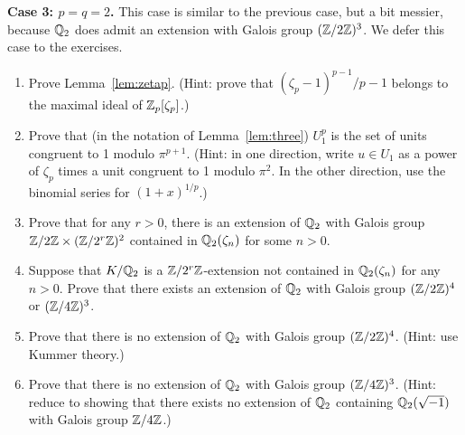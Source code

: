 \noindent
\textbf{Case 3: $p=q=2$.}
This case is similar to the previous case, but a bit messier, because
$\mathbb{Q}_2$ does admit an extension with Galois group $(\mathbb{Z}/2\mathbb{Z})^3$.
We defer this case to the exercises.


\begin{enumerate}
\item
Prove Lemma~\ref{lem:zetap}. (Hint: prove that $(\zeta_p-1)^{p-1}/p - 1$
belongs to the maximal ideal of $\mathbb{Z}_p[\zeta_p]$.)
\item
Prove that (in the notation of Lemma~\ref{lem:three})
$U_1^p$ is the set of units congruent to 1 modulo $\pi^{p+1}$.
(Hint: in one direction, write $u \in U_1$ as a power of $\zeta_p$ times
a unit congruent to 1 modulo $\pi^2$. In the other direction,
use the binomial series for $(1+x)^{1/p}$.)
\item
Prove that for any $r>0$, there is an extension of $\mathbb{Q}_2$ with Galois group
$\mathbb{Z}/2\mathbb{Z} \times (\mathbb{Z}/2^r\mathbb{Z})^2$ contained in $\mathbb{Q}_2(\zeta_n)$ for some
$n>0$.
\item
Suppose that $K/\mathbb{Q}_2$ is a $\mathbb{Z}/2^r\mathbb{Z}$-extension not contained in
$\mathbb{Q}_2(\zeta_n)$ for any $n>0$. Prove that there exists
an extension of $\mathbb{Q}_2$ with Galois group $(\mathbb{Z}/2\mathbb{Z})^4$ or $(\mathbb{Z}/4\mathbb{Z})^3$.
\item
Prove that there is no extension of $\mathbb{Q}_2$ with Galois group $(\mathbb{Z}/2\mathbb{Z})^4$.
(Hint: use Kummer theory.)
\item
Prove that there is no extension of $\mathbb{Q}_2$ with Galois group $(\mathbb{Z}/4\mathbb{Z})^3$.
(Hint: reduce to showing that there exists no extension of $\mathbb{Q}_2$ containing
$\mathbb{Q}_2(\sqrt{-1})$ with Galois group $\mathbb{Z}/4\mathbb{Z}$.)
\end{enumerate}

%


